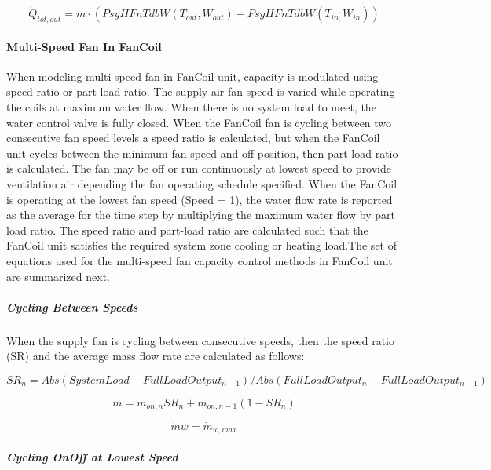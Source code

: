 \begin{equation}
{\dot Q_{tot,out}} = \dot m\cdot ({PsyHFnTdbW}({T_{out}},{W_{out}}) - {PsyHFnTdbW}({T_{in,}}{W_{in}}))
\end{equation}

\paragraph{Multi-Speed Fan In FanCoil}\label{multi-speed-fan-in-fancoil}

When modeling multi-speed fan in FanCoil unit, capacity is modulated using speed ratio or part load ratio. The supply air fan speed is varied while operating the coils at maximum water flow. When there is no system load to meet, the water control valve is fully closed. When the FanCoil fan is cycling between two consecutive fan speed levels a speed ratio is calculated, but when the FanCoil unit cycles between the minimum fan speed and off-position, then part load ratio is calculated. The fan may be off or run continuously at lowest speed to provide ventilation air depending the fan operating schedule specified. When the FanCoil is operating at the lowest fan speed (Speed = 1), the water flow rate is reported as the average for the time step by multiplying the maximum water flow by part load ratio. The speed ratio and part-load ratio are calculated such that the FanCoil unit satisfies the required system zone cooling or heating load.The set of equations used for the multi-speed fan capacity control methods in FanCoil unit are summarized next.

\subparagraph{Cycling Between Speeds}\label{cycling-between-speeds}

When the supply fan is cycling between consecutive speeds, then the speed ratio (SR) and the average mass flow rate are calculated as follows:

\begin{equation}
  {SR_{n}} = Abs({SystemLoad} - {FullLoadOutput_{n-1}}) / Abs({FullLoadOutput_{n}} - {FullLoadOutput_{n-1}})
\end{equation}

\begin{equation}
  {\dot m} = {\dot m_{on, n}} {SR_{n}} + {\dot m_{on, n-1}} (1 - {SR_{n}})
\end{equation}

\begin{equation}
  {\dot m{w}} = {\dot m_{w, max}}
\end{equation}

\subparagraph{Cycling OnOff at Lowest Speed}\label{cycling-onoff-at-lowest-speed}

